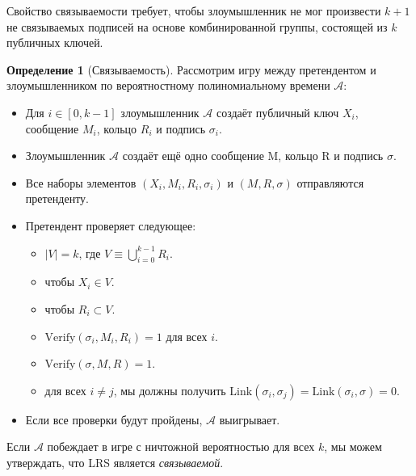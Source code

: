 \documentclass{article}
\newcommand{\A}{\mathcal{A}}
\theoremstyle{definition}
\newtheorem{definition}{Определение}
\begin{document}
Свойство связываемости требует, чтобы злоумышленник не мог произвести $k+1$ не связываемых подписей на основе комбинированной группы, состоящей из $k$ публичных ключей.
\begin{definition}[Связываемость]
Рассмотрим игру между претендентом и злоумышленником по вероятностному полиномиальному времени $\A$:
\begin{itemize}
\item Для $i \in [0,k-1]$ злоумышленник $\A$ создаёт публичный ключ $X_i$, сообщение $M_i$, кольцо $R_i$ и подпись $\sigma_i$.
\item Злоумышленник $\A$ создаёт ещё одно сообщение M, кольцо R и подпись $\sigma$.
\item Все наборы элементов $(X_i,M_i,R_i,\sigma_i)$ и $(M,R,\sigma)$ отправляются претенденту.
\item Претендент проверяет следующее:
\begin{itemize}
\item $\left| V \right| = k$, где $V \equiv \bigcup_{i=0}^{k-1} R_i$.
\item чтобы $X_i \in V$.
\item чтобы $R_i \subset V$.
\item $\text{Verify}(\sigma_i,M_i,R_i) = 1$ для всех $i$.
\item $\text{Verify}(\sigma,M,R) = 1$.
\item для всех $i \neq j$, мы должны получить $\text{Link}(\sigma_i,\sigma_j) = \text{Link}(\sigma_i,\sigma) = 0$.
\end{itemize}
\item Если все проверки будут пройдены, $\A$ выигрывает.
\end{itemize}
Если $\A$ побеждает в игре с ничтожной вероятностью для всех $k$, мы можем утверждать, что LRS является \textit{связываемой}.
\end{definition}
\end{document}
